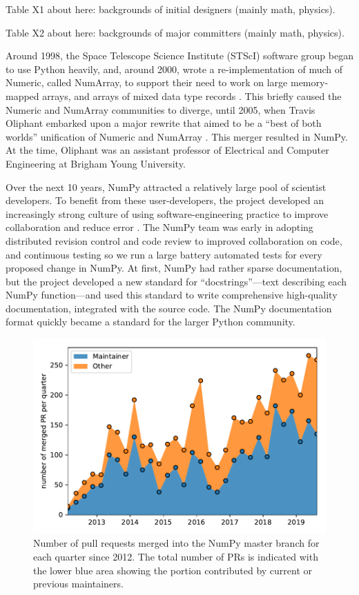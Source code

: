 Table X1 about here: backgrounds of initial designers (mainly math, physics).

Table X2 about here: backgrounds of major committers (mainly math, physics).

Around 1998, the Space Telescope Science Institute (STScI) software group began
to use Python heavily, and, around 2000, wrote a re-implementation of much of
Numeric, called NumArray, to support their need to work on large memory-mapped
arrays, and arrays of mixed data type records \cite{STScI-slither}.  This
briefly caused the Numeric and NumArray communities to diverge, until 2005,
when Travis Oliphant embarked upon a major rewrite that aimed to be a ``best of
both worlds'' unification of Numeric and NumArray \cite{oliphant2006guide}.
This merger resulted in NumPy.  At the time, Oliphant was an assistant
professor of Electrical and Computer Engineering at Brigham Young University.

Over the next 10 years, NumPy attracted a relatively large pool of scientist
developers.  To benefit from these
user-developers, the project developed an increasingly strong culture of using
software-engineering practice to improve collaboration and reduce error
\cite{millman2014developing}. The NumPy team was early in adopting distributed
revision control and code review to improved collaboration on code, and
continuous testing so we run a large battery automated tests for every proposed
change in NumPy. At first, NumPy had rather sparse documentation, but the project
developed a new standard for ``docstrings''---text describing each NumPy
function---and used this standard to write comprehensive high-quality
documentation, integrated with the source code. The NumPy documentation format
quickly became a standard for the larger Python community.

\begin{figure}
    \centering
    \includegraphics[width=0.9\linewidth]{scripts/PRs-using-CURRENT_MAINTAINERS.pdf}
    \caption{Number of pull requests merged into the NumPy master branch for each
        quarter since 2012. The total number of PRs is indicated with the
        lower blue area showing the portion contributed by current or previous
        maintainers.}\label{fig:prs-over-time}
\end{figure}


